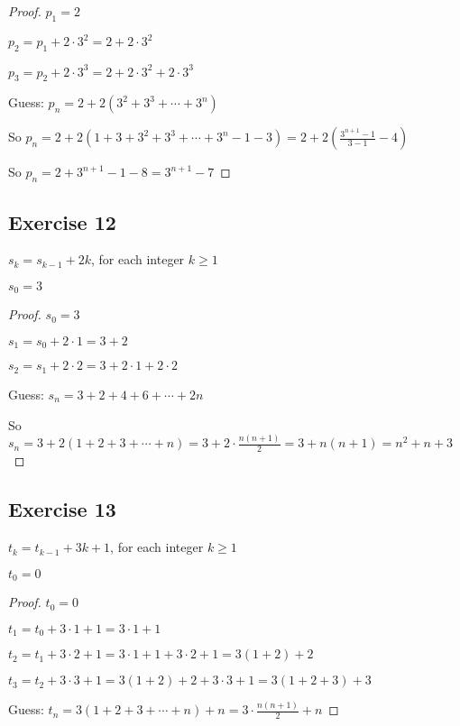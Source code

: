 \documentclass[14pt]{extarticle}
\newcommand{\dps}{\displaystyle}
\begin{document}
    \begin{proof}
        \(p_1 = 2\)

        \(p_2 = p_1 + 2 \cdot 3^2 = 2 + 2 \cdot 3^2\)

        \(p_3 = p_2 + 2 \cdot 3^3 = 2 + 2 \cdot 3^2 + 2 \cdot 3^3\)

        Guess: \(p_n = 2 + 2(3^2 + 3^3 + \cdots + 3^n)\)

        So \(\dps p_n = 2 + 2(1 + 3 + 3^2 + 3^3 + \cdots + 3^n - 1 - 3) = 2 + 2 \left(\frac{3^{n+1} - 1}{3 - 1} - 4 \right)\)

        So \(\dps p_n = 2 + 3^{n+1} - 1 - 8 = 3^{n+1} - 7\)
    \end{proof}

    \subsection{Exercise 12}
    \(s_k = s_{k-1} + 2k\), for each integer \(k \geq 1\)

    \(s_0 = 3\)

    \begin{proof}
        \(s_0 = 3\)

        \(s_1 = s_0 + 2 \cdot 1 = 3 + 2\)

        \(s_2 = s_1 + 2 \cdot 2 = 3 + 2 \cdot 1 + 2 \cdot 2\)

        Guess: \(s_n = 3 + 2 + 4 + 6 + \cdots + 2n\)

        So \(s_n = 3 + 2(1 + 2 + 3 + \cdots + n) = 3 + 2 \cdot \frac{n(n+1)}{2} = 3 + n(n+1) = n^2 + n + 3\)
    \end{proof}

    \subsection{Exercise 13}
    \(t_k = t_{k-1} + 3k + 1\), for each integer \(k \geq 1\)

    \(t_0 = 0\)

    \begin{proof}
        \(t_0 = 0\)

        \(t_1 = t_0 + 3 \cdot 1 + 1 = 3 \cdot 1 + 1\)

        \(t_2 = t_1 + 3 \cdot 2 + 1 = 3 \cdot 1 + 1 + 3 \cdot 2 + 1 = 3(1+2)+2\)

        \(t_3 = t_2 + 3 \cdot 3 + 1 = 3(1+2)+2 + 3 \cdot 3 + 1 = 3(1+2+3)+3\)

        Guess: \(\dps t_n = 3(1+2+3+\cdots+n)+n = 3 \cdot \frac{n(n+1)}{2} + n\)
    \end{proof}
\end{document}
